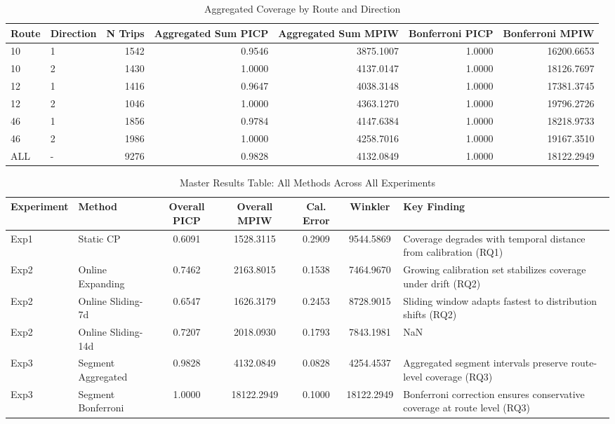\begin{table}
\caption{Aggregated Coverage by Route and Direction}
\label{tab:t63_aggregated_coverage}
\begin{tabular}{llrrrrr}
\toprule
Route & Direction & N Trips & Aggregated Sum PICP & Aggregated Sum MPIW & Bonferroni PICP & Bonferroni MPIW \\
\midrule
10 & 1 & 1542 & 0.9546 & 3875.1007 & 1.0000 & 16200.6653 \\
10 & 2 & 1430 & 1.0000 & 4137.0147 & 1.0000 & 18126.7697 \\
12 & 1 & 1416 & 0.9647 & 4038.3148 & 1.0000 & 17381.3745 \\
12 & 2 & 1046 & 1.0000 & 4363.1270 & 1.0000 & 19796.2726 \\
46 & 1 & 1856 & 0.9784 & 4147.6384 & 1.0000 & 18218.9733 \\
46 & 2 & 1986 & 1.0000 & 4258.7016 & 1.0000 & 19167.3510 \\
ALL & - & 9276 & 0.9828 & 4132.0849 & 1.0000 & 18122.2949 \\
\bottomrule
\end{tabular}
\end{table}



\begin{table}
\caption{Master Results Table: All Methods Across All Experiments}
\label{tab:master_results}
\begin{tabular}{llccccl}
\toprule
Experiment & Method & Overall PICP & Overall MPIW & Cal. Error & Winkler & Key Finding \\
\midrule
Exp1 & Static CP & 0.6091 & 1528.3115 & 0.2909 & 9544.5869 & Coverage degrades with temporal distance from calibration (RQ1) \\
Exp2 & Online Expanding & 0.7462 & 2163.8015 & 0.1538 & 7464.9670 & Growing calibration set stabilizes coverage under drift (RQ2) \\
Exp2 & Online Sliding-7d & 0.6547 & 1626.3179 & 0.2453 & 8728.9015 & Sliding window adapts fastest to distribution shifts (RQ2) \\
Exp2 & Online Sliding-14d & 0.7207 & 2018.0930 & 0.1793 & 7843.1981 & NaN \\
Exp3 & Segment Aggregated & 0.9828 & 4132.0849 & 0.0828 & 4254.4537 & Aggregated segment intervals preserve route-level coverage (RQ3) \\
Exp3 & Segment Bonferroni & 1.0000 & 18122.2949 & 0.1000 & 18122.2949 & Bonferroni correction ensures conservative coverage at route level (RQ3) \\
\bottomrule
\end{tabular}
\end{table}



